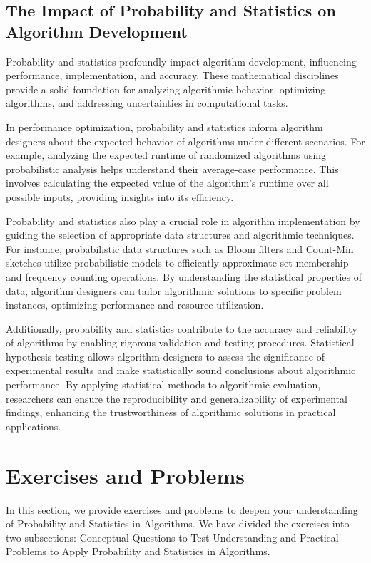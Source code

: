 \documentclass[12pt]{book} %
\begin{document}
\subsection{The Impact of Probability and Statistics on Algorithm Development}

Probability and statistics profoundly impact algorithm development, influencing performance, implementation, and accuracy. These mathematical disciplines provide a solid foundation for analyzing algorithmic behavior, optimizing algorithms, and addressing uncertainties in computational tasks.

In performance optimization, probability and statistics inform algorithm designers about the expected behavior of algorithms under different scenarios. For example, analyzing the expected runtime of randomized algorithms using probabilistic analysis helps understand their average-case performance. This involves calculating the expected value of the algorithm's runtime over all possible inputs, providing insights into its efficiency.

Probability and statistics also play a crucial role in algorithm implementation by guiding the selection of appropriate data structures and algorithmic techniques. For instance, probabilistic data structures such as Bloom filters and Count-Min sketches utilize probabilistic models to efficiently approximate set membership and frequency counting operations. By understanding the statistical properties of data, algorithm designers can tailor algorithmic solutions to specific problem instances, optimizing performance and resource utilization.

Additionally, probability and statistics contribute to the accuracy and reliability of algorithms by enabling rigorous validation and testing procedures. Statistical hypothesis testing allows algorithm designers to assess the significance of experimental results and make statistically sound conclusions about algorithmic performance. By applying statistical methods to algorithmic evaluation, researchers can ensure the reproducibility and generalizability of experimental findings, enhancing the trustworthiness of algorithmic solutions in practical applications.


\section{Exercises and Problems}
In this section, we provide exercises and problems to deepen your understanding of Probability and Statistics in Algorithms. We have divided the exercises into two subsections: Conceptual Questions to Test Understanding and Practical Problems to Apply Probability and Statistics in Algorithms.
\end{document}
